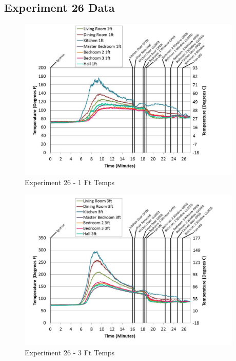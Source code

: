 \documentclass{article}
\begin{document}
\begin{appendices}
		\clearpage
\clearpage		\large
\subsection{Experiment 26 Data} \label{App:Exp26Results} 

	\begin{figure}[h!]
		\centering
		\includegraphics[height=3.05in]{0_Images/Results_Charts/Exp_26_Charts/1FtTemps.pdf}
		\caption{Experiment 26 - 1 Ft Temps}
	\end{figure}
 

	\begin{figure}[h!]
		\centering
		\includegraphics[height=3.05in]{0_Images/Results_Charts/Exp_26_Charts/3FtTemps.pdf}
		\caption{Experiment 26 - 3 Ft Temps}
	\end{figure}
 
	\clearpage


\end{appendices}
\end{document}
